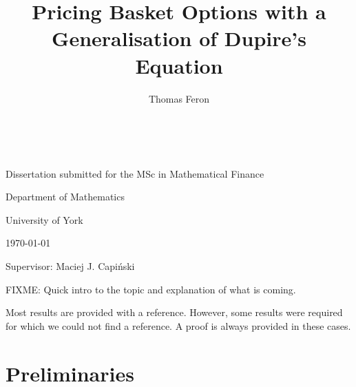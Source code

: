 \documentclass[english]{article}
\numberwithin{equation}{section}
\numberwithin{figure}{section}
\theoremstyle{bolddescit}
\theoremstyle{definition}
\theoremstyle{definition}
\theoremstyle{plain}
\theoremstyle{plain}
\theoremstyle{bolddesc}
\theoremstyle{plain}
\theoremstyle{remark}
\begin{document}
\title{Pricing Basket Options with a Generalisation of Dupire's Equation}
\author{Thomas Feron}
\date{~}

\maketitle
\vspace{2.5in}

\noindent \begin{center}
Dissertation submitted for the MSc in Mathematical Finance
\par\end{center}

\begin{center}
\bigskip{}
\par\end{center}

\begin{center}
Department of Mathematics

University of York\bigskip{}
\par\end{center}

\begin{center}
\today
\par\end{center}

\vspace{1in}

\begin{center}
Supervisor: Maciej J. Capi\'nski
\par\end{center}

\newpage{}

\tableofcontents{}\newpage{}

\pagebreak

FIXME: Quick intro to the topic and explanation of what is coming.

Most results are provided with a reference. However, some results were required for which we could not find a reference. A proof is always provided in these cases.

\section{Preliminaries}

\end{document}
